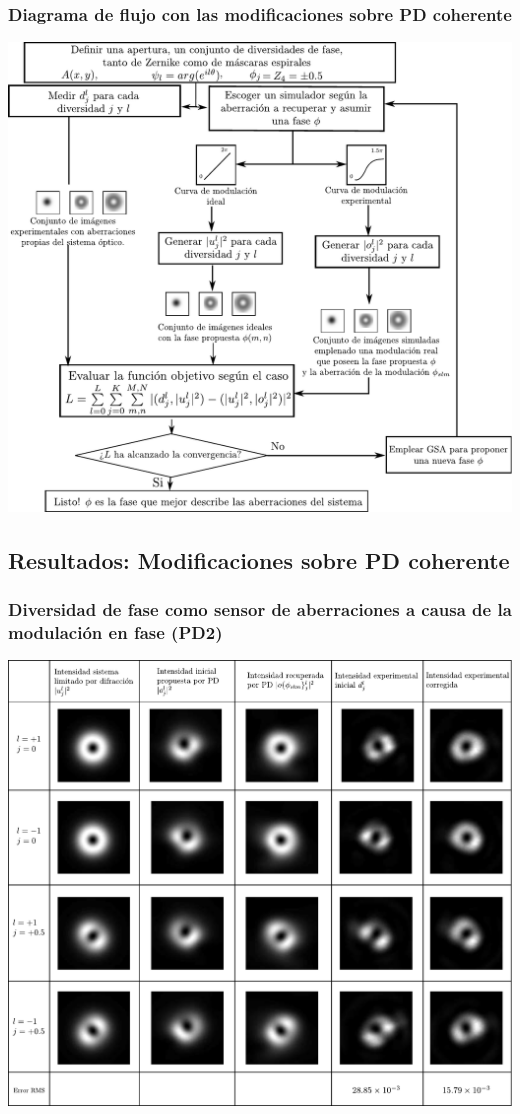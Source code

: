 \documentclass[serif,8pt]{beamer}
\begin{document}
		
%		
		\begin{frame}
		\frametitle{Diagrama de flujo con las modificaciones sobre PD coherente}
			\begin{center}
			\includegraphics[scale=0.4]{img/pdfluxadd.pdf}
			\end{center}
		\end{frame}	
	
	\subsection{Resultados: Modificaciones sobre PD coherente}
		\begin{frame}
		\frametitle{Diversidad de fase como sensor de aberraciones a causa de la modulación en fase (PD2)}
		\begin{center}
		\includegraphics[scale=0.4]{img/CorPD2.pdf}
		\end{center}
		\end{frame}
\end{document}

